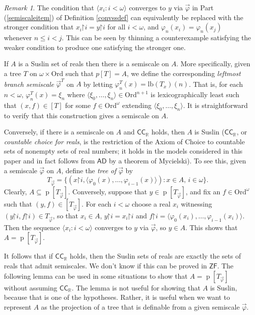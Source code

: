 \documentclass[fleqn, 11pt]{amsart}
\theoremstyle{plain}
\theoremstyle{definition}
\theoremstyle{remark}
\newtheorem{rem}[thm]{Remark} \newtheorem*{rem*}{Remark}
\newcommand{\Ord}{\mathrm{Ord}}
\newcommand{\lb}{\mathrm{lb}}
\newcommand{\bbR}{\mathbb{R}}
\newcommand{\AD}{\mathsf{AD}}
\newcommand{\restrict}{\mathord{\restriction}}
\DeclareMathOperator{\p}{p}
\begin{document}
\begin{rem}\label{weakscalerem} The condition that $\langle x_{i} : i < \omega\rangle$ converges to $y$ via $\vec{\varphi}$ in Part (\ref{semiscaleitem}) of Definition \ref{convssdef} can equivalently be replaced with the stronger condition that $x_{i} \restrict i = y \restrict i$ for all $i < \omega$, and $\varphi_{n}(x_{i}) = \varphi_{n}(x_{j})$ whenever $n \leq i < j$. This can be seen by thinning a counterexample satisfying the weaker condition to produce one satisfying the stronger one. 
\end{rem}

If $A$ is a Suslin set of reals then there is a semiscale on $A$.
More specifically,
given a tree $T$ on $\omega \times \Ord$ such that $p[T] = A$,
we define the corresponding \emph{leftmost branch semiscale} $\vec{\varphi}^T$ on $A$ by letting 
$\varphi^{T}_{n}(x) = \lb(T_{x})(n)$. 
That is, for each $n < \omega$,
$\varphi^T_n(x) = \xi_n$ where
$\langle \xi_0,\ldots,\xi_n \rangle \in \Ord^{n+1}$ is lexicographically least such that $(x,f) \in [T]$ for some $f\in \Ord^\omega$ extending $\langle \xi_0,\ldots,\xi_n\rangle$.
It is straightforward to verify that this construction gives a semiscale on $A$.

Conversely, if there is a semiscale on $A$ and $\mathsf{CC}_\mathbb{R}$ holds, then $A$ is Suslin ($\mathsf{CC}_{\bbR}$, or \emph{countable choice for reals}, is the restriction of the Axiom of Choice to countable sets of nonempty sets of real numbers; it holds in the models considered in this paper and in fact follows from $\AD$ by a theorem of Mycielski).
To see this, given a semiscale $\vec{\varphi}$ on $A$, define the \emph{tree of} $\vec{\varphi}$ by
\[T_{\vec{\varphi}} = \{ (x \restrict i, \langle \varphi_0(x),\ldots,\varphi_{i-1}(x)\rangle) : x \in A,\, i \in \omega\}.\]
Clearly, $A \subseteq \p[T_{\vec{\varphi}}]$.  Conversely, suppose that $y \in \p[T_{\vec{\varphi}}]$, and fix an $f \in \Ord^\omega$ such that
  $(y,f) \in [T_{\vec{\varphi}}]$.
 For each $i < \omega$ choose a real $x_i$ witnessing $(y \restrict i, f \restrict i) \in T_{\vec{\varphi}}$, so that $x_i \in A$,  $y \restrict i = x_i \restrict i$ and 
 $f \restrict i = \langle\varphi_0(x_i),\ldots,\varphi_{i-1}(x_i)\rangle$.
Then the sequence $\langle x_i : i < \omega\rangle$ converges to $y$ via $\vec{\varphi}$, so $y \in A$.
This shows that $A = \p[T_{\vec{\varphi}}]$.

It follows that if $\mathsf{CC}_\mathbb{R}$ holds, then the Suslin sets of reals are exactly the sets of reals that admit semiscales. We don't know if this can be proved in $\mathsf{ZF}$.
The following lemma can be used in some situations to show that $A = \p[T_{\vec{\varphi}}]$ without assuming $\mathsf{CC}_\mathbb{R}$.
The lemma is not useful for showing that $A$ is Suslin, because that is one of the hypotheses.  Rather, it is useful when we want to represent $A$ as the projection of a tree that is definable from a given semiscale $\vec{\varphi}$.
\end{document}
